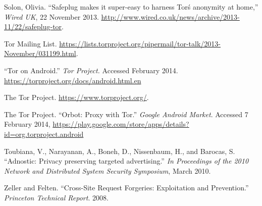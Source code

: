 \documentclass[conference]{IEEEtran}
\begin{document}
\begin{thebibliography}{1}
 Solon, Olivia. ``Safeplug makes it super-easy to harness Tor\'s anonymity at home,'' \emph{Wired UK}, 22 November 2013. \url{http://www.wired.co.uk/news/archive/2013-11/22/safeplug-tor}.

 Tor Mailing List.  \url{https://lists.torproject.org/pipermail/tor-talk/2013-November/031199.html}.

 ``Tor on Android.'' \emph{Tor Project.} Accessed February 2014. \url{https://torproject.org/docs/android.html.en}

 The Tor Project.  \url{https://www.torproject.org/}.

 The Tor Project. ``Orbot: Proxy with Tor.'' \emph{Google Android Market}. Accessed 7 February 2014, \url{https://play.google.com/store/apps/details?id=org.torproject.android}

 Toubiana, V., Narayanan, A., Boneh, D., Nissenbaum, H., and Barocas, S. ``Adnostic: Privacy preserving targeted advertising.'' \emph{In Proceedings of the 2010 Network and Distributed System Security Symposium}, March 2010.


 Zeller and Felten. ``Cross-Site Request Forgeries: Exploitation and Prevention.'' \emph{Princeton Technical Report}. 2008.

\end{thebibliography}




\end{document}

